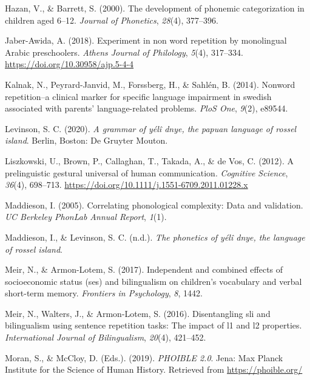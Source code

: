 \documentclass[english,,man,floatsintext]{apa6}
\begin{document}
\leavevmode\hypertarget{ref-hazan2000development}{}%
Hazan, V., \& Barrett, S. (2000). The development of phonemic categorization in children aged 6--12. \emph{Journal of Phonetics}, \emph{28}(4), 377--396.

\leavevmode\hypertarget{ref-jabere2018xperiment}{}%
Jaber-Awida, A. (2018). Experiment in non word repetition by monolingual Arabic preschoolers. \emph{Athens Journal of Philology}, \emph{5}(4), 317--334. \url{https://doi.org/10.30958/ajp.5-4-4}

\leavevmode\hypertarget{ref-kalnak2014nonword}{}%
Kalnak, N., Peyrard-Janvid, M., Forssberg, H., \& Sahlén, B. (2014). Nonword repetition--a clinical marker for specific language impairment in swedish associated with parents' language-related problems. \emph{PloS One}, \emph{9}(2), e89544.

\leavevmode\hypertarget{ref-levinsonYDgrammar}{}%
Levinson, S. C. (2020). \emph{A grammar of yélî dnye, the papuan language of rossel island}. Berlin, Boston: De Gruyter Mouton.

\leavevmode\hypertarget{ref-liszkowski2012prelinguistic}{}%
Liszkowski, U., Brown, P., Callaghan, T., Takada, A., \& de Vos, C. (2012). A prelinguistic gestural universal of human communication. \emph{Cognitive Science}, \emph{36}(4), 698--713. \url{https://doi.org/10.1111/j.1551-6709.2011.01228.x}

\leavevmode\hypertarget{ref-maddieson2005correlating}{}%
Maddieson, I. (2005). Correlating phonological complexity: Data and validation. \emph{UC Berkeley PhonLab Annual Report}, \emph{1}(1).

\leavevmode\hypertarget{ref-maddiesonIPphoneticsYD}{}%
Maddieson, I., \& Levinson, S. C. (n.d.). \emph{The phonetics of yélî dnye, the language of rossel island}.

\leavevmode\hypertarget{ref-meir2017independent}{}%
Meir, N., \& Armon-Lotem, S. (2017). Independent and combined effects of socioeconomic status (ses) and bilingualism on children's vocabulary and verbal short-term memory. \emph{Frontiers in Psychology}, \emph{8}, 1442.

\leavevmode\hypertarget{ref-meir2016disentangling}{}%
Meir, N., Walters, J., \& Armon-Lotem, S. (2016). Disentangling sli and bilingualism using sentence repetition tasks: The impact of l1 and l2 properties. \emph{International Journal of Bilingualism}, \emph{20}(4), 421--452.

\leavevmode\hypertarget{ref-phoible}{}%
Moran, S., \& McCloy, D. (Eds.). (2019). \emph{PHOIBLE 2.0}. Jena: Max Planck Institute for the Science of Human History. Retrieved from \url{https://phoible.org/}
\end{document}
